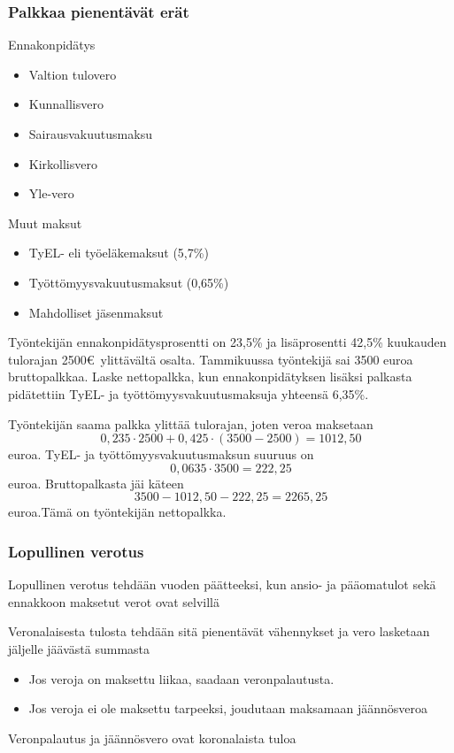 \documentclass[]{beamer}\usepackage[]{graphicx}\usepackage[]{color}
\begin{document}
\begin{frame}
\frametitle{Palkkaa pienentävät erät}
	\begin{block}{Ennakonpidätys}
		\begin{itemize}
			\item Valtion tulovero
			\item Kunnallisvero
			\item Sairausvakuutusmaksu
			\item Kirkollisvero
			\item Yle-vero
		\end{itemize}
	\end{block}
	\begin{block}{Muut maksut}
		\begin{itemize}
			\item TyEL- eli työeläkemaksut (5,7\%)
			\item Työttömyysvakuutusmaksut (0,65\%)
			\item Mahdolliset jäsenmaksut
		\end{itemize}
	\end{block}
\end{frame}

\begin{frame}
	\begin{esim}
		Työntekijän ennakonpidätysprosentti on 23,5\% ja lisäprosentti 42,5\% kuukauden tulorajan 2500\euro\ ylittävältä osalta. Tammikuussa työntekijä sai 3500 euroa bruttopalkkaa. Laske nettopalkka, kun ennakonpidätyksen lisäksi palkasta pidätettiin TyEL- ja työttömyysvakuutusmaksuja yhteensä 6,35\%.
	\end{esim}
\end{frame}

\begin{frame}
	\begin{ratkaisu}
		Työntekijän saama palkka ylittää tulorajan\pause , joten veroa maksetaan 
		\[
			0,235\cdot2500 + 0,425\cdot(3500-2500) = 1012,50
		\] euroa. \pause TyEL- ja työttömyysvakuutusmaksun suuruus on\pause 
		\[
			0,0635\cdot 3500 = 222,25
		\] euroa. \pause
		Bruttopalkasta jäi käteen\pause
		\[
			3500-1012,50-222,25 = 2265,25
		\]
		 euroa.\pause Tämä on työntekijän nettopalkka.
	\end{ratkaisu}
\end{frame}


\begin{frame}
  \frametitle{Lopullinen verotus}
  \pause
  Lopullinen verotus tehdään vuoden päätteeksi, kun ansio- ja pääomatulot sekä ennakkoon maksetut verot ovat selvillä
  \begin{block}{}
  Veronalaisesta tulosta tehdään sitä pienentävät vähennykset ja vero lasketaan jäljelle jäävästä summasta 
  	\begin{itemize}
  		\item Jos veroja on maksettu liikaa, saadaan veronpalautusta.
  		\item Jos veroja ei ole maksettu tarpeeksi, joudutaan maksamaan jäännösveroa
  	\end{itemize}
  \end{block}
  \pause
  Veronpalautus ja jäännösvero ovat koronalaista tuloa
\end{frame}
\end{document}
